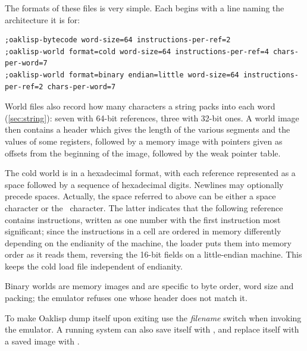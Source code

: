 The formats of these files is very simple.  Each begins with a line
naming the architecture it is for:
\begin{verbatim}
;oaklisp-bytecode word-size=64 instructions-per-ref=2
;oaklisp-world format=cold word-size=64 instructions-per-ref=4 chars-per-word=7
;oaklisp-world format=binary endian=little word-size=64 instructions-per-ref=2 chars-per-word=7
\end{verbatim}
World files also record how many characters a string packs into each
word (\ref{sec:string}): seven with 64-bit references, three with
32-bit ones.
A world image then contains a header which gives the length of the
various segments and the values of some registers, followed by a
memory image with pointers given as offsets from the beginning of the
image, followed by the weak pointer table.

The cold world is in a hexadecimal format, with each reference
represented as a space followed by a sequence of hexadecimal digits.
Newlines may optionally precede spaces.  Actually, the space referred
to above can be either a space character or the \upar\ character.
The latter indicates that the following reference contains
instructions, written as one number with the first instruction most
significant; since the instructions in a cell are ordered in memory
differently depending on the endianity of the machine, the loader
puts them into memory order as it reads them, reversing the 16-bit
fields on a little-endian machine.  This keeps the cold load file
independent of endianity.

Binary worlds are memory images and are specific to byte order, word
size and packing; the emulator refuses one whose header does not match
it.

To make Oaklisp dump itself upon exiting use the 
\emph{filename} switch when invoking the emulator.  A running system
can also save itself with , and replace itself with a
saved image with .
